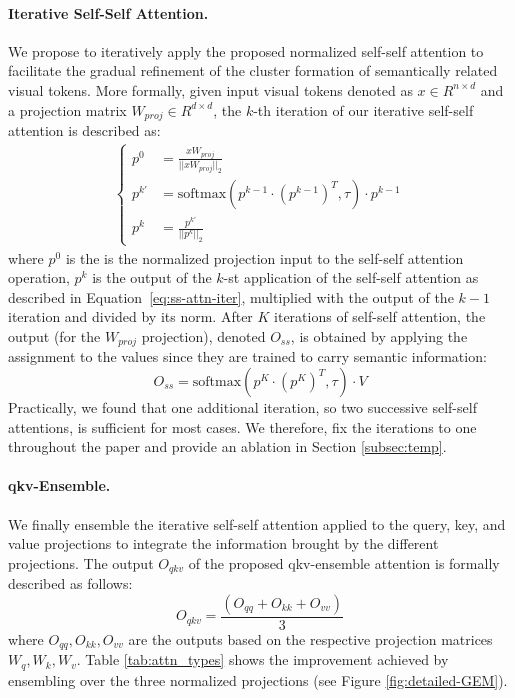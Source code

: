 \documentclass[10pt,twocolumn,letterpaper]{article}
\begin{document}
\paragraph{Iterative Self-Self Attention.}
We propose to iteratively apply the proposed normalized self-self attention to facilitate the gradual refinement of the cluster formation of semantically related visual tokens.
More formally, given input visual tokens denoted as $x \in R^{n \times d}$ and a projection matrix $W_{proj} \in R^{d \times d}$, the $k$-th iteration of our iterative self-self attention is described as:
\begin{equation}\label{eq:ss-attn-iter}
\begin{aligned}   
\left \{
 \begin{array}{lll}
    p^0 &= \frac{x W_{proj}}{||x W_{proj}||_2} \\
    p^{k\prime} &= \mathrm{softmax}(p^{k-1} \cdot (p^{k-1})^T, \tau) \cdot p^{k-1} \\
    p^k &= \frac{p^{k\prime}}{||p^k||_2}
 \end{array}
\right .
\end{aligned}
\end{equation}
where $p^0$ is the is the normalized projection input to the self-self attention operation, $p^k$ is the output of the $k$-st application of the self-self attention as described in Equation~\ref{eq:ss-attn-iter}, multiplied with the output of the $k-1$ iteration and divided by its norm. 
After $K$ iterations of self-self attention, the output (for the $W_{proj}$ projection), denoted $O_{ss}$, is obtained by applying the assignment to the values since they are trained to carry semantic information: 
\begin{equation}\label{eq:self-self-attn-output-iter}
    O_{ss} = \mathrm{softmax}(p^K \cdot (p^K)^T, \tau) \cdot V     
\end{equation}
Practically, we found that one additional iteration, so two successive self-self attentions, is sufficient for most cases. We therefore, fix the iterations to one throughout the paper and provide an ablation in Section \ref{subsec:temp}.

\paragraph{qkv-Ensemble.}
We finally ensemble the iterative self-self attention applied to the query, key, and value projections to integrate the information brought by the different projections. 
The output $O_{qkv}$ of the proposed qkv-ensemble attention is formally described as follows:
\begin{equation}\label{eq:ss-attn-ens-output}
     O_{qkv} = \frac{(O_{qq} + O_{kk} + O_{vv})}{3}
\end{equation}
where $O_{qq}, O_{kk}, O_{vv}$ are the outputs based on the respective projection matrices $W_q, W_k, W_v$.
Table \ref{tab:attn_types} shows the improvement achieved by ensembling over the three normalized projections (see Figure \ref{fig:detailed-GEM}). 
\end{document}
